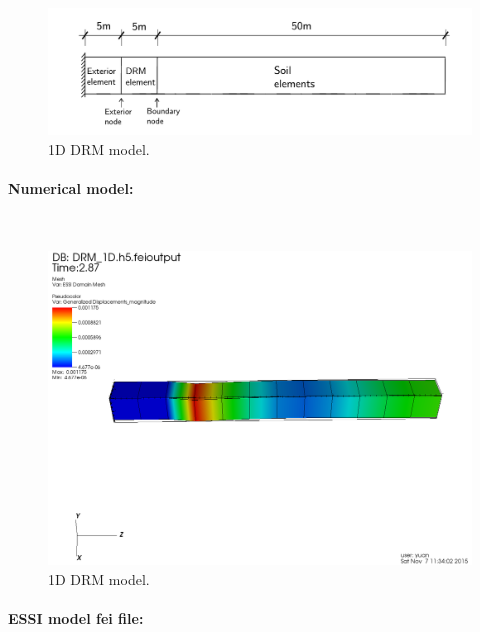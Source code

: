\documentclass[fleqn,11pt]{article}
\begin{document}
\begin{figure}[!htb]
  \centering
  \includegraphics[width=18cm]{../Figure-files/_Chapter_Appendix_Illustrative_Examples/DRM_1D_descrp.pdf}
  \caption{1D DRM model.}
  \label{fig_Program_description_for_the_1D_DRM_model}
\end{figure}




\paragraph{Numerical model:} ~


\begin{figure}[!htb]
  \centering
  \includegraphics[width=15cm]{../Figure-files/_Chapter_Appendix_Illustrative_Examples/DRM_1D_result41.png}
  \caption{1D DRM model.}
  \label{fig Diagram for the 1D DRM model}
\end{figure}




\paragraph{ESSI model fei file: } ~
\end{document}
